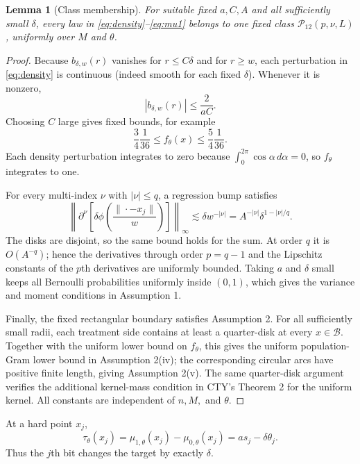 \documentclass[11pt]{article}
\newtheorem{lemma}{Lemma}
\newcommand{\cB}{\mathcal B}
\newcommand{\1}{\mathbf 1}
\begin{document}
\begin{lemma}[Class membership]
\label{lem:class}
For suitable fixed $a,C,A$ and all sufficiently small $\delta$, every law in \eqref{eq:density}--\eqref{eq:mu1} belongs to one fixed class $\mathcal P_{12}(p,\nu,L)$, uniformly over $M$ and $\theta$.
\end{lemma}

\begin{proof}
Because $b_{\delta,w}(r)$ vanishes for $r\le C\delta$ and for $r\ge w$, each perturbation in \eqref{eq:density} is continuous (indeed smooth for each fixed $\delta$).  Whenever it is nonzero,
\[
|b_{\delta,w}(r)|\le \frac{2}{aC}.
\]
Choosing $C$ large gives fixed bounds, for example
\[
\frac{3}{4}\frac1{36}\le f_\theta(x)\le\frac{5}{4}\frac1{36}.
\]
Each density perturbation integrates to zero because
$\int_0^{2\pi}\cos\alpha\,d\alpha=0$, so $f_\theta$ integrates to one.

For every multi-index $\nu$ with $|\nu|\le q$, a regression bump satisfies
\[
\left\|\partial^\nu\left[
\delta\phi\!\left(\frac{\|\cdot-x_j\|}{w}\right)
\right]\right\|_\infty
\lesssim \delta w^{-|\nu|}
=A^{-|\nu|}\delta^{1-|\nu|/q}.
\]
The disks are disjoint, so the same bound holds for the sum.  At order $q$ it is $O(A^{-q})$; hence the derivatives through order $p=q-1$ and the Lipschitz constants of the $p$th derivatives are uniformly bounded.  Taking $a$ and $\delta$ small keeps all Bernoulli probabilities uniformly inside $(0,1)$, which gives the variance and moment conditions in Assumption 1.

Finally, the fixed rectangular boundary satisfies Assumption 2.  For all sufficiently small radii, each treatment side contains at least a quarter-disk at every $x\in\cB$.  Together with the uniform lower bound on $f_\theta$, this gives the uniform population-Gram lower bound in Assumption 2(iv); the corresponding circular arcs have positive finite length, giving Assumption 2(v).  The same quarter-disk argument verifies the additional kernel-mass condition in CTY's Theorem 2 for the uniform kernel.  All constants are independent of $n,M,$ and $\theta$.
\end{proof}

At a hard point $x_j$,
\begin{equation}
\tau_\theta(x_j)
=\mu_{1,\theta}(x_j)-\mu_{0,\theta}(x_j)
=a s_j-\delta\theta_j.                                       \label{eq:targetbits}
\end{equation}
Thus the $j$th bit changes the target by exactly $\delta$.
\end{document}

